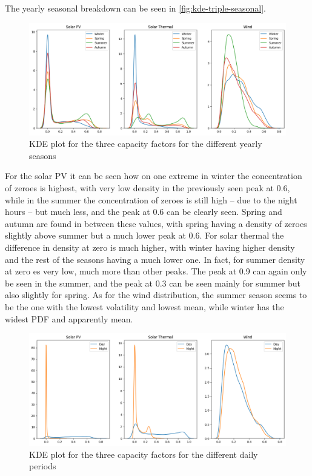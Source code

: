 The yearly seasonal breakdown can be seen in \autoref{fig:kde-triple-seasonal}. 

\begin{figure}[ht]
    \centering
    \captionsetup{justification=centering}
    \includegraphics[width=\linewidth]{assets/kde-triple-seasonal.png}
    \caption{KDE plot for the three capacity factors for the different yearly seasons}
    \label{fig:kde-triple-seasonal}
\end{figure}

For the solar PV it can be seen how on one extreme in winter the concentration of zeroes is highest, with very low density in the previously seen peak at 0.6, while in the summer the concentration of zeroes is still high -- due to the night hours -- but much less, and the peak at 0.6 can be clearly seen. Spring and autumn are found in between these values, with spring having a density of zeroes slightly above summer but a much lower peak at 0.6. For solar thermal the difference in density at zero is much higher, with winter having higher density and the rest of the seasons having a much lower one. In fact, for summer density at zero es very low, much more than other peaks. The peak at 0.9 can again only be seen in the summer, and the peak at 0.3 can be seen mainly for summer but also slightly for spring. As for the wind distribution, the summer season seems to be the one with the lowest volatility and lowest mean, while winter has the widest PDF and apparently mean.  

\begin{figure}[ht]
    \centering
    \captionsetup{justification=centering}
    \includegraphics[width=\linewidth]{assets/kde-triple-daily.png}
    \caption{KDE plot for the three capacity factors for the different daily periods}
    \label{fig:kde-triple-daily}
\end{figure}


